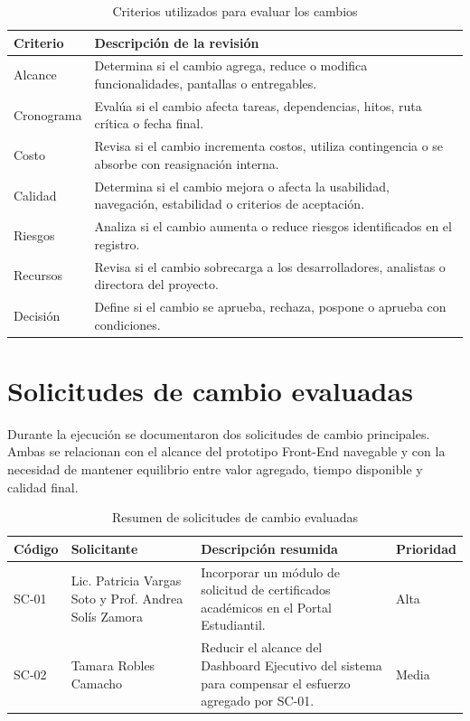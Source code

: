 \documentclass[11pt,spanish]{article}
\begin{document}
\begin{table}[H]
\centering
\caption{Criterios utilizados para evaluar los cambios}
\label{tab:criterios-evaluacion}
{\small
\begin{tabularx}{\textwidth}{p{3.5cm} Y}
\toprule
\textbf{Criterio} & \textbf{Descripción de la revisión} \\
\midrule
Alcance & Determina si el cambio agrega, reduce o modifica funcionalidades, pantallas o entregables. \\
Cronograma & Evalúa si el cambio afecta tareas, dependencias, hitos, ruta crítica o fecha final. \\
Costo & Revisa si el cambio incrementa costos, utiliza contingencia o se absorbe con reasignación interna. \\
Calidad & Determina si el cambio mejora o afecta la usabilidad, navegación, estabilidad o criterios de aceptación. \\
Riesgos & Analiza si el cambio aumenta o reduce riesgos identificados en el registro. \\
Recursos & Revisa si el cambio sobrecarga a los desarrolladores, analistas o directora del proyecto. \\
Decisión & Define si el cambio se aprueba, rechaza, pospone o aprueba con condiciones. \\
\bottomrule
\end{tabularx}
}
\end{table}

\section{Solicitudes de cambio evaluadas}

Durante la ejecución se documentaron dos solicitudes de cambio principales. Ambas se relacionan con el alcance del prototipo Front-End navegable y con la necesidad de mantener equilibrio entre valor agregado, tiempo disponible y calidad final.

\begin{table}[H]
\centering
\caption{Resumen de solicitudes de cambio evaluadas}
\label{tab:solicitudes-evaluadas}
{\small
\begin{tabularx}{\textwidth}{p{1.6cm} p{3cm} Y p{2.2cm}}
\toprule
\textbf{Código} & \textbf{Solicitante} & \textbf{Descripción resumida} & \textbf{Prioridad} \\
\midrule
SC-01 & Lic. Patricia Vargas Soto y Prof. Andrea Solís Zamora & Incorporar un módulo de solicitud de certificados académicos en el Portal Estudiantil. & Alta \\
SC-02 & Tamara Robles Camacho & Reducir el alcance del Dashboard Ejecutivo del sistema para compensar el esfuerzo agregado por SC-01. & Media \\
\bottomrule
\end{tabularx}
}
\end{table}
\end{document}
